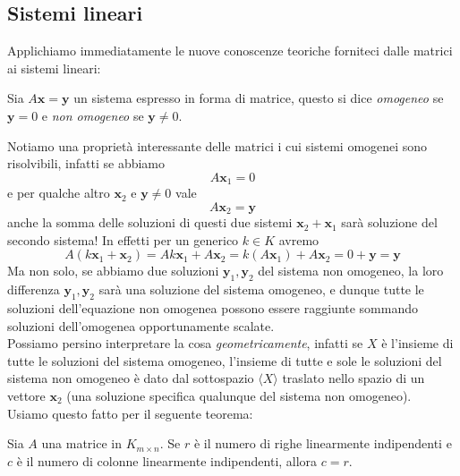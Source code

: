 \documentclass[11pt]{scrartcl}
\begin{document}
 	\subsection{Sistemi lineari}
 	Applichiamo immediatamente le nuove conoscenze teoriche forniteci dalle matrici ai sistemi lineari:
 	\begin{definition}
 		Sia $A\mathbf{x}=\mathbf{y}$ un sistema espresso in forma di matrice, questo si dice \textit{omogeneo} se $\mathbf{y}=0$ e \textit{non omogeneo} se $\mathbf{y}\ne 0$.
 	\end{definition}
 	Notiamo una proprietà interessante delle matrici i cui sistemi omogenei sono risolvibili, infatti se abbiamo
 	$$A\mathbf{x}_1=0$$
 	e per qualche altro $\mathbf{x}_2$ e $\mathbf{y}\ne 0$ vale
 	$$A\mathbf{x}_2=\mathbf{y}$$
 	anche la somma delle soluzioni di questi due sistemi $\mathbf{x}_2+\mathbf{x}_1$ sarà soluzione del secondo sistema! In effetti per un generico $k\in K$ avremo
 	$$A(k\mathbf{x}_1+\mathbf{x}_2)=Ak\mathbf{x}_1+A\mathbf{x}_2=k(A\mathbf{x}_1)+A\mathbf{x}_2=0+\mathbf{y}=\mathbf{y}$$
 	Ma non solo, se abbiamo due soluzioni $\mathbf{y}_1,\mathbf{y}_2$ del sistema non omogeneo, la loro differenza $\mathbf{y}_1,\mathbf{y}_2$ sarà una soluzione del sistema omogeneo, e dunque tutte le soluzioni dell'equazione non omogenea possono essere raggiunte sommando soluzioni dell'omogenea opportunamente scalate. \\
 	Possiamo persino interpretare la cosa \textit{geometricamente}, infatti se $X$ è l'insieme di tutte le soluzioni del sistema omogeneo, l'insieme di tutte e sole le soluzioni del sistema non omogeneo è dato dal sottospazio $\langle X\rangle$ traslato nello spazio di un vettore $\mathbf{x}_2$ (una soluzione specifica qualunque del sistema non omogeneo). \\
 	Usiamo questo fatto per il seguente teorema:
 	\begin{theorem}
 		Sia $A$ una matrice in $K_{m\times n}$. Se $r$ è il numero di righe linearmente indipendenti e $c$ è il numero di colonne linearmente indipendenti, allora $c=r$.
 	\end{theorem}
\end{document}
